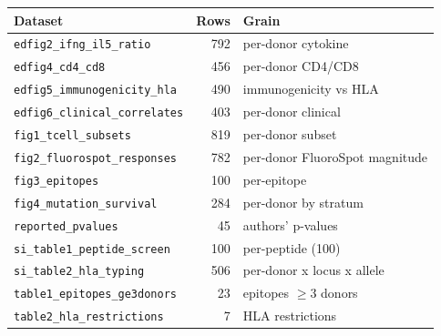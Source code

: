 \begin{tabular}{p{6.0cm}rp{5.6cm}}
\toprule
Dataset & Rows & Grain \\
\midrule
\texttt{edfig2\_ifng\_il5\_ratio} & 792 & per-donor cytokine \\
\texttt{edfig4\_cd4\_cd8} & 456 & per-donor CD4/CD8 \\
\texttt{edfig5\_immunogenicity\_hla} & 490 & immunogenicity vs HLA \\
\texttt{edfig6\_clinical\_correlates} & 403 & per-donor clinical \\
\texttt{fig1\_tcell\_subsets} & 819 & per-donor subset \\%
\texttt{fig2\_fluorospot\_responses} & 782 & per-donor FluoroSpot magnitude \\
\texttt{fig3\_epitopes} & 100 & per-epitope \\
\texttt{fig4\_mutation\_survival} & 284 & per-donor by stratum \\
\texttt{reported\_pvalues} & 45 & authors' p-values \\
\texttt{si\_table1\_peptide\_screen} & 100 & per-peptide (100) \\
\texttt{si\_table2\_hla\_typing} & 506 & per-donor x locus x allele \\
\texttt{table1\_epitopes\_ge3donors} & 23 & epitopes $\geq$3 donors \\
\texttt{table2\_hla\_restrictions} & 7 & HLA restrictions \\
\bottomrule
\end{tabular}
